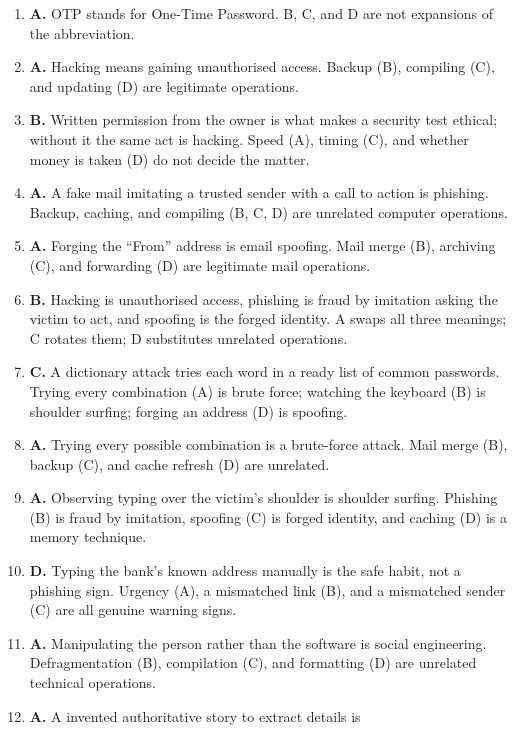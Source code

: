 \begin{enumerate}[label=\textbf{Q\arabic*.}, leftmargin=*]
\item \textbf{A.} OTP stands for One-Time Password. B, C, and D are not
  expansions of the abbreviation.
\item \textbf{A.} Hacking means gaining unauthorised access. Backup (B),
  compiling (C), and updating (D) are legitimate operations.
\item \textbf{B.} Written permission from the owner is what makes a
  security test ethical; without it the same act is hacking. Speed (A),
  timing (C), and whether money is taken (D) do not decide the matter.
\item \textbf{A.} A fake mail imitating a trusted sender with a call to
  action is phishing. Backup, caching, and compiling (B, C, D) are
  unrelated computer operations.
\item \textbf{A.} Forging the ``From'' address is email spoofing. Mail
  merge (B), archiving (C), and forwarding (D) are legitimate mail
  operations.
\item \textbf{B.} Hacking is unauthorised access, phishing is fraud by
  imitation asking the victim to act, and spoofing is the forged
  identity. A swaps all three meanings; C rotates them; D substitutes
  unrelated operations.
\item \textbf{C.} A dictionary attack tries each word in a ready list of
  common passwords. Trying every combination (A) is brute force;
  watching the keyboard (B) is shoulder surfing; forging an address (D)
  is spoofing.
\item \textbf{A.} Trying every possible combination is a brute-force
  attack. Mail merge (B), backup (C), and cache refresh (D) are
  unrelated.
\item \textbf{A.} Observing typing over the victim's shoulder is
  shoulder surfing. Phishing (B) is fraud by imitation, spoofing (C) is
  forged identity, and caching (D) is a memory technique.
\item \textbf{D.} Typing the bank's known address manually is the safe
  habit, not a phishing sign. Urgency (A), a mismatched link (B), and a
  mismatched sender (C) are all genuine warning signs.
\item \textbf{A.} Manipulating the person rather than the software is
  social engineering. Defragmentation (B), compilation (C), and
  formatting (D) are unrelated technical operations.
\item \textbf{A.} A invented authoritative story to extract details is

\end{enumerate}
